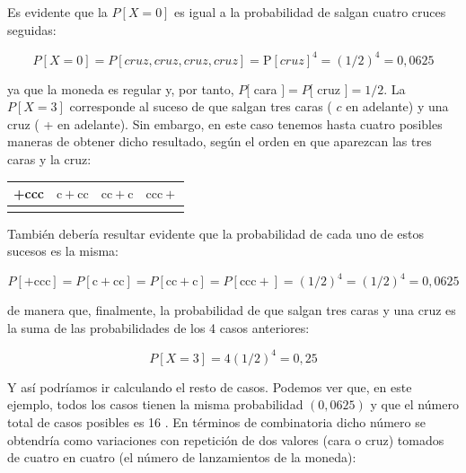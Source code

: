 \documentclass[
]{article}
\begin{document}
Es evidente que la \(P[X=0]\) es igual a la probabilidad de salgan cuatro cruces seguidas:

\[
P[X=0]=P[c r u z, c r u z, c r u z, c r u z]=\mathrm{P}[c r u z]^{4}=(1 / 2)^{4}=0,0625
\]

ya que la moneda es regular y, por tanto, \(P[\) cara \(]=P[\) cruz \(]=1 / 2\).
La \(P[X=3]\) corresponde al suceso de que salgan tres caras ( \(c\) en adelante) y una cruz ( + en adelante). Sin embargo, en este caso tenemos hasta cuatro posibles maneras de obtener dicho resultado, según el orden en que aparezcan las tres caras y la cruz:

\begin{longtable}[]{@{}
  >{\centering\arraybackslash}p{}
  >{\centering\arraybackslash}p{}
  >{\centering\arraybackslash}p{}
  >{\centering\arraybackslash}p{}@{}}
\toprule\noalign{}
\begin{minipage}[b]{\linewidth}\centering
+ccc
\end{minipage} & \begin{minipage}[b]{\linewidth}\centering
\(\mathrm{c}+\mathrm{cc}\)
\end{minipage} & \begin{minipage}[b]{\linewidth}\centering
\(\mathrm{cc}+\mathrm{c}\)
\end{minipage} & \begin{minipage}[b]{\linewidth}\centering
\(\mathrm{ccc}+\)
\end{minipage} \\
\midrule\noalign{}
\endhead
\bottomrule\noalign{}
\endlastfoot
\end{longtable}

También debería resultar evidente que la probabilidad de cada uno de estos sucesos es la misma:

\[
P[+\mathrm{ccc}]=P[\mathrm{c}+\mathrm{cc}]=P[\mathrm{cc}+\mathrm{c}]=P[\mathrm{ccc}+]=(1 / 2)^{4}=(1 / 2)^{4}=0,0625
\]

de manera que, finalmente, la probabilidad de que salgan tres caras y una cruz es la suma de las probabilidades de los 4 casos anteriores:

\[
P[X=3]=4(1 / 2)^{4}=0,25
\]

Y así podríamos ir calculando el resto de casos. Podemos ver que, en este ejemplo, todos los casos tienen la misma probabilidad \((0,0625)\) y que el número total de casos posibles es 16 . En términos de combinatoria dicho número se obtendría como variaciones con repetición de dos valores (cara o cruz) tomados de cuatro en cuatro (el número de lanzamientos de la moneda):
\end{document}
